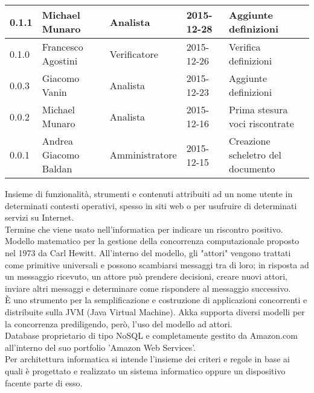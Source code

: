 \documentclass{scalatekids-article}
\begin{document}
\begin{center}
\begin{tabular}{|l | l | l | l | l |}
    0.1.1 & Michael Munaro & Analista & 2015-12-28 & Aggiunte definizioni\\
    \hline
    0.1.0 & Francesco Agostini & Verificatore & 2015-12-26 & Verifica definizioni\\
    \hline
    0.0.3 & Giacomo Vanin & Analista & 2015-12-23 & Aggiunte definizioni\\
    \hline
    0.0.2 & Michael Munaro & Analista & 2015-12-16 & Prima stesura voci riscontrate\\
    \hline
    0.0.1 & Andrea Giacomo Baldan & Amministratore & 2015-12-15 & Creazione scheletro del documento\\
    \hline
  \end{tabular}
\end{center}

\newpage
{}
 Insieme di funzionalità, strumenti e contenuti attribuiti ad un nome utente in determinati contesti operativi, spesso in siti web o per usufruire di determinati servizi su Internet.
\\

 Termine che viene usato nell'informatica per indicare un riscontro positivo.
\\

 Modello matematico per la gestione della concorrenza computazionale proposto nel 1973 da Carl Hewitt.
All'interno del modello, gli "attori" vengono trattati come primitive universali e possono scambiarsi messaggi tra di loro; in risposta ad un messaggio ricevuto, un attore può prendere decisioni, creare nuovi attori, inviare altri messaggi e determinare come rispondere al messaggio successivo.
\\

 È uno strumento per la semplificazione e costruzione di applicazioni concorrenti e distribuite sulla JVM (Java Virtual Machine). Akka supporta diversi modelli per la concorrenza prediligendo, però, l'uso del modello ad attori.
\\

 Database proprietario di tipo NoSQL e completamente gestito da Amazon.com all'interno del suo portfolio 'Amazon Web Services'.
\\

 Per architettura informatica si intende l'insieme dei criteri e regole in base ai quali è progettato e realizzato un sistema informatico oppure un dispositivo facente parte di esso.
\\
\end{document}
